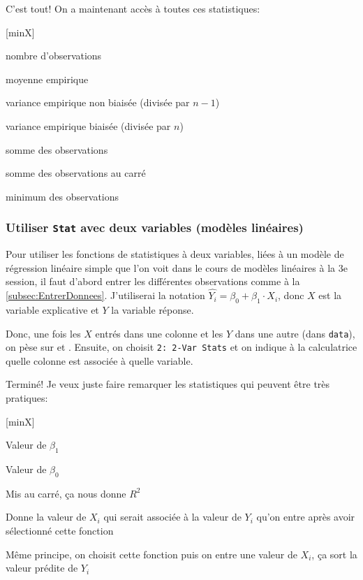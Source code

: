 C'est tout! On a maintenant accès à toutes ces statistiques:

\begin{desclist}{\sf}{ \rm\hfill}[minX]

\item [n] nombre d'observations
\item [x] moyenne empirique
\item [Sx] variance empirique non biaisée (divisée par ${n - 1}$)
\item [$\sigma_{x}$] variance empirique biaisée (divisée par ${n}$)
\item [$\sum x$] somme des observations
\item [$\sum x^{2}$] somme des observations au carré
\item [minX] minimum des observations
\item [\ldots]

\end{desclist}



\subsubsection[Utiliser \texttt{Stat} avec deux variables]{Utiliser \texttt{Stat} avec deux variables (modèles linéaires)}
\label{subsec:statdeuxvariables}

Pour utiliser les fonctions de statistiques à deux variables, liées à un modèle de régression linéaire simple que l'on voit dans le cours de modèles linéaires à la 3e session, il faut d'abord entrer les différentes observations comme à la \ref{subsec:EntrerDonnees}. J'utiliserai la notation $\hat{Y_i} = \beta_0 + \beta_1 \cdot X_i$, donc $X$ est la variable explicative et $Y$ la variable réponse.

Donc, une fois les $X$ entrés dans une colonne et les $Y$ dans une autre (dans \texttt{data}), on pèse sur  et . Ensuite, on choisit \texttt{2: 2-Var Stats} et on indique à la calculatrice quelle colonne est associée à quelle variable.

Terminé! Je veux juste faire remarquer les statistiques qui peuvent être très pratiques:

\begin{desclist}{\sf}{ \rm\hfill}[minX]

\item [a] Valeur de $\beta_1$
\item [b] Valeur de $\beta_0$
\item [r] Mis au carré, ça nous donne $R^2$
\item [x'] Donne la valeur de $X_i$ qui serait associée à la valeur de $Y_i$ qu'on entre après avoir sélectionné cette fonction
\item [y'] Même principe, on choisit cette fonction puis on entre une valeur de $X_i$, ça sort la valeur prédite de $Y_i$

\end{desclist}